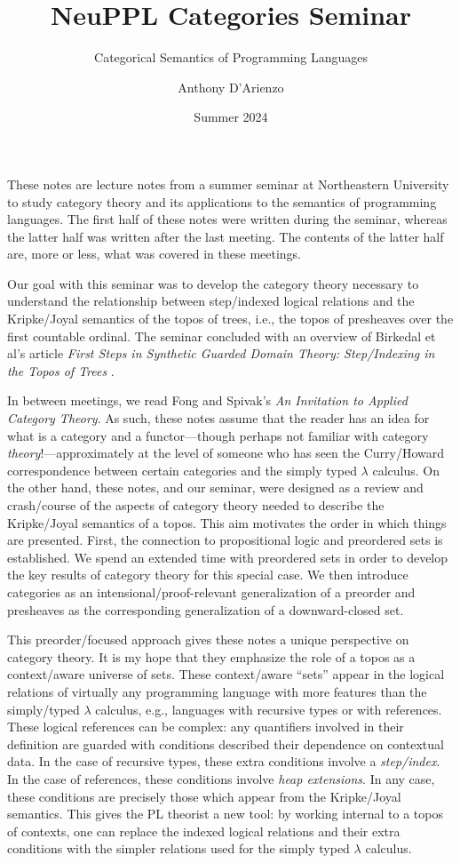 \documentclass{./thesis-note}
\subtitle{Categorical Semantics of Programming Languages}
\title{\color{NortheasternRed} NeuPPL Categories Seminar}
\author{Anthony D'Arienzo}
\date{Summer 2024}
\begin{document}
\doublespacing%
\vspace{\fill}
\makehomeworktitle%
\onehalfspacing%
\vspace{0.05\paperheight}

These notes are lecture notes from a summer seminar at
Northeastern University to study category theory and its applications
to the semantics of programming languages. The first half of these
notes were written during the seminar, whereas the latter half was
written after the last meeting. The contents of the latter half are,
more or less, what was covered in these meetings.

Our goal with this seminar was to develop the category theory
necessary to understand the relationship between step\-/indexed
logical relations and the Kripke\-/Joyal semantics of the topos of
trees, i.e., the topos of presheaves over the first countable
ordinal. The seminar concluded with an overview of Birkedal et al's
article \emph{First Steps in Synthetic Guarded Domain Theory:
  Step\-/Indexing in the Topos of Trees} \cite{5970227}.

In between meetings, we read Fong and Spivak's \emph{An Invitation to
  Applied Category Theory}\linebreak\cite{Fong2019}. As such, these
notes assume that the reader has an idea for what is a category and a
functor---though perhaps not familiar with category
\emph{theory}!---approximately at the level of someone who has seen
the Curry\-/Howard correspondence between certain categories and the
simply typed \(\lambda\) calculus. On the other hand, these notes, and
our seminar, were designed as a review and crash\-/course of the
aspects of category theory needed to describe the Kripke\-/Joyal
semantics of a topos. This aim motivates the order in which things are
presented. First, the connection to propositional logic and preordered
sets is established. We spend an extended time with preordered sets in
order to develop the key results of category theory for this special
case. We then introduce categories as an intensional/proof-relevant
generalization of a preorder and presheaves as the corresponding
generalization of a downward-closed set.

This preorder\-/focused approach gives these notes a unique
perspective on category theory. It is my hope that they emphasize the
role of a topos as a context\-/aware universe of sets. These
context\-/aware ``sets'' appear in the logical relations of virtually
any programming language with more features than the simply\-/typed
\(\lambda\) calculus, e.g., languages with recursive types or with
references. These logical references can be complex: any quantifiers
involved in their definition are guarded with conditions described
their dependence on contextual data. In the case of recursive types,
these extra conditions involve a \emph{step\-/index}. In the case of
references, these conditions involve \emph{heap extensions}. In any
case, these conditions are precisely those which appear from the
Kripke\-/Joyal semantics. This gives the PL theorist a new tool: by
working internal to a topos of contexts, one can replace the indexed
logical relations and their extra conditions with the simpler
relations used for the simply typed \(\lambda\) calculus.
\end{document}
